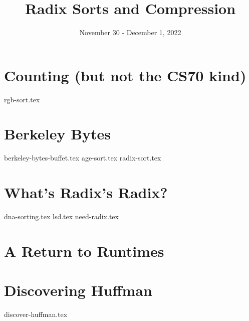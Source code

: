 \documentclass[11pt]{exam}
\title{Radix Sorts and Compression}
\date{November 30 - December 1, 2022}
\begin{document}
\maketitle

\section{Counting (but not the CS70 kind)}
\begin{questions}
{rgb-sort.tex}
\end{questions}

\pagebreak
\section{Berkeley Bytes}
\begin{questions}
{berkeley-bytes-buffet.tex}
{age-sort.tex}
{radix-sort.tex}
\end{questions}

\pagebreak
\section{What's Radix's Radix?}
\begin{questions}
{dna-sorting.tex}
{lsd.tex}
{need-radix.tex}
\end{questions}

\pagebreak
\section{A Return to Runtimes}
\begin{questions}
\end{questions}

\pagebreak
\section{Discovering Huffman}
\begin{questions}
{discover-huffman.tex}
\end{questions}
\end{document}
